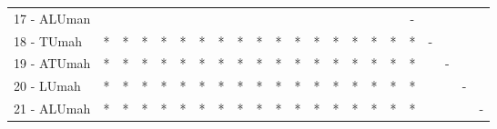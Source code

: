 \begin{table}[h]
\begin{center}
\begin{tabular}{lcc|cc|cc|cc|cc|cc|cc|cc|cc|cc|c}
17 - ALUman	&   &   &   &   &   &   &   &   &   &   &   &   &   &   &   &   & - &   &   &   &   \\
18 - TUmah	& * & * & * & * & * & * & * & * & * & * & * & * & * & * & * & * & * & - &   &   &   \\ \hline
19 - ATUmah	& * & * & * & * & * & * & * & * & * & * & * & * & * & * & * & * & * &   & - &   &   \\
20 - LUmah	& * & * & * & * & * & * & * & * & * & * & * & * & * & * & * & * & * &   &   & - &   \\ \hline
21 - ALUmah	& * & * & * & * & * & * & * & * & * & * & * & * & * & * & * & * & * &   &   &   & - \\\end{tabular}
\label{stratsALCKappaFriedSVM}
\end{center}
\end{table}